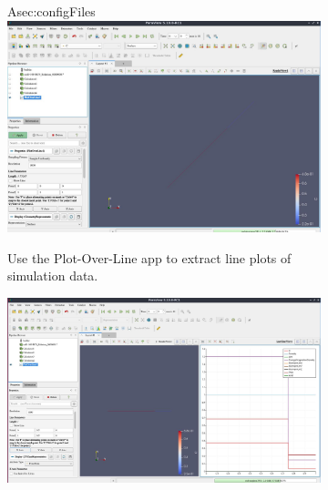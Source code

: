 \begin{appendices}
\begin{figure}
\centering
\begin{subfigure}{.95\textwidth}Asec:configFiles
  \centering
  \includegraphics[width=.9\linewidth,height=0.9\linewidth,scale=1]{figures/paraviewGrabs/POL1.jpg}
  \caption{Use the Plot-Over-Line app to extract line plots of simulation data.}
  \label{fig:POL1}
\end{subfigure}
\begin{subfigure}{.95\textwidth}
  \centering
  \includegraphics[width=.9\linewidth,height=0.9\linewidth,scale=1]{figures/paraviewGrabs/POL2.jpg}

\end{subfigure}
\end{figure}
\end{appendices}
